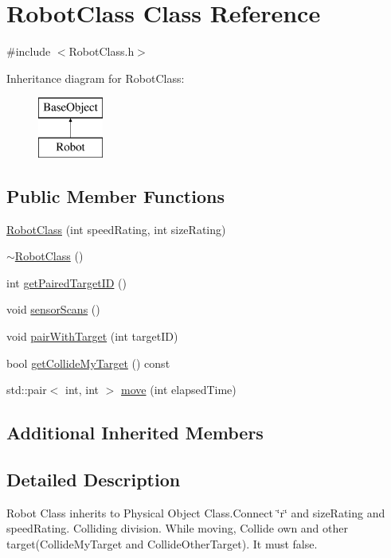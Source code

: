 \hypertarget{classRobot}{\section{Robot\-Class Class Reference}
\label{classRobot}
}


{\ttfamily \#include $<$Robot\-Class.\-h$>$}

Inheritance diagram for Robot\-Class\-:\begin{figure}[H]
\begin{center}
\leavevmode
\includegraphics[height=2.000000cm]{classRobot}
\end{center}
\end{figure}
\subsection*{Public Member Functions}
\begin{DoxyCompactItemize}
\item 
\hyperlink{classRobot_a63be173f16090051ec1511ecb575b172}{Robot\-Class} (int speed\-Rating, int size\-Rating)
\item 
\hyperlink{classRobot_a7d7725737f146f85ed7ceeae7f300e9e}{$\sim$\-Robot\-Class} ()
\item 
int \hyperlink{classRobot_aae444573292a51965b1d5bb6afff98ae}{get\-Paired\-Target\-I\-D} ()
\item 
void \hyperlink{classRobot_ae7d53136664afd535d131b9baee5e612}{sensor\-Scans} ()
\item 
void \hyperlink{classRobot_a2db2a59cc182f84161f5f1aacc6d4bb5}{pair\-With\-Target} (int target\-I\-D)
\item 
bool \hyperlink{classRobot_a98c54dafd9d1fe72f77532d9d8547282}{get\-Collide\-My\-Target} () const 
\item 
std\-::pair$<$ int, int $>$ \hyperlink{classRobot_a57863760977d7f8552ee9119b8deb62e}{move} (int elapsed\-Time)
\end{DoxyCompactItemize}
\subsection*{Additional Inherited Members}


\subsection{Detailed Description}
Robot Class inherits to Physical Object Class.\-Connect \char`\"{}r\char`\"{} and size\-Rating and speed\-Rating. Colliding division. While moving, Collide own and other target(\-Collide\-My\-Target and Collide\-Other\-Target). It must false. 

